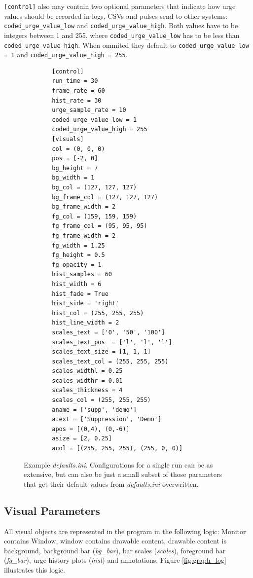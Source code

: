 \documentclass[12pt,a4paper]{book}
\begin{document}
\verb|[control]| also may contain two optional parameters that indicate how urge values should be recorded in logs, CSVs and pulses send to other systems: \verb|coded_urge_value_low| and \verb|coded_urge_value_high|. Both values have to be integers between 1 and 255, where \verb|coded_urge_value_low| has to be less than \verb|coded_urge_value_high|. When ommited they default to \verb|coded_urge_value_low = 1| and \verb|coded_urge_value_high = 255|. 

\begin{figure}
	\begin{framed}
		\begin{verbatim}
		[control]
		run_time = 30
		frame_rate = 60
		hist_rate = 30
		urge_sample_rate = 10
		coded_urge_value_low = 1
		coded_urge_value_high = 255
		[visuals]
		col = (0, 0, 0)
		pos = [-2, 0]
		bg_height = 7
		bg_width = 1
		bg_col = (127, 127, 127)
		bg_frame_col = (127, 127, 127)
		bg_frame_width = 2
		fg_col = (159, 159, 159)
		fg_frame_col = (95, 95, 95)
		fg_frame_width = 2
		fg_width = 1.25
		fg_height = 0.5
		fg_opacity = 1
		hist_samples = 60
		hist_width = 6
		hist_fade = True
		hist_side = 'right'
		hist_col = (255, 255, 255)
		hist_line_width = 2
		scales_text = ['0', '50', '100']
		scales_text_pos  = ['l', 'l', 'l']
		scales_text_size = [1, 1, 1]
		scales_text_col = (255, 255, 255)
		scales_widthl = 0.25
		scales_widthr = 0.01
		scales_thickness = 4
		scales_col = (255, 255, 255)
		aname = ['supp', 'demo']
		atext = ['Suppression', 'Demo']
		apos = [(0,4), (0,-6)]
		asize = [2, 0.25]
		acol = [(255, 255, 255), (255, 0, 0)]
	\end{verbatim}\end{framed}
	\caption{Example \textit{defaults.ini}. Configurations for a single run can be as extensive, but can also be just a small subset of those parameters that get their default values from \textit{defaults.ini} overwritten.}
	\label{fig:defaultsini}
\end{figure}

\subsection{Visual Parameters}\label{ssec:visuals}

All visual objects are represented in the program in the following logic: Monitor contains Window, window contains drawable content, drawable content is background, background bar (\emph{bg\_bar}), bar scales (\emph{scales}), foreground bar (\emph{fg\_bar}), urge history plots (\emph{hist}) and annotations. Figure \ref{fig:graph_log} illustrates this logic.
\end{document}
